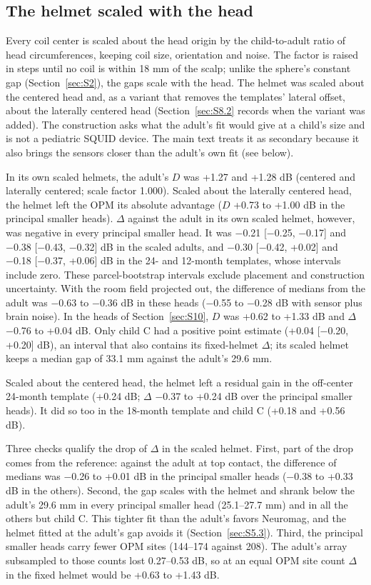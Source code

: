 \documentclass[preprint,12pt,authoryear,a4paper]{elsarticle}
\begin{document}
\subsection{The helmet scaled with the head}\label{sec:S5.2}

Every coil center is scaled about the head origin by the child-to-adult ratio of head circumferences, keeping coil size, orientation and noise. The factor is raised in steps until no coil is within 18 mm of the scalp; unlike the sphere's constant gap (Section~\ref{sec:S2}), the gaps scale with the head. The helmet was scaled about the centered head and, as a variant that removes the templates' lateral offset, about the laterally centered head (Section~\ref{sec:S8.2} records when the variant was added). The construction asks what the adult's fit would give at a child's size and is not a pediatric SQUID device. The main text treats it as secondary because it also brings the sensors closer than the adult's own fit (see below).

In its own scaled helmets, the adult's $D$ was +1.27 and +1.28 dB (centered and laterally centered; scale factor 1.000). Scaled about the laterally centered head, the helmet left the OPM its absolute advantage ($D$ +0.73 to +1.00 dB in the principal smaller heads). $\Delta$ against the adult in its own scaled helmet, however, was negative in every principal smaller head. It was −0.21 [−0.25, −0.17] and −0.38 [−0.43, −0.32] dB in the scaled adults, and −0.30 [−0.42, +0.02] and −0.18 [−0.37, +0.06] dB in the 24- and 12-month templates, whose intervals include zero. These parcel-bootstrap intervals exclude placement and construction uncertainty. With the room field projected out, the difference of medians from the adult was −0.63 to −0.36 dB in these heads (−0.55 to −0.28 dB with sensor plus brain noise). In the heads of Section~\ref{sec:S10}, $D$ was +0.62 to +1.33 dB and $\Delta$ −0.76 to +0.04 dB. Only child C had a positive point estimate (+0.04 [−0.20, +0.20] dB), an interval that also contains its fixed-helmet $\Delta$; its scaled helmet keeps a median gap of 33.1 mm against the adult's 29.6 mm.

Scaled about the centered head, the helmet left a residual gain in the off-center 24-month template (+0.24 dB; $\Delta$ −0.37 to +0.24 dB over the principal smaller heads). It did so too in the 18-month template and child C (+0.18 and +0.56 dB).

Three checks qualify the drop of $\Delta$ in the scaled helmet. First, part of the drop comes from the reference: against the adult at top contact, the difference of medians was −0.26 to +0.01 dB in the principal smaller heads (−0.38 to +0.33 dB in the others). Second, the gap scales with the helmet and shrank below the adult's 29.6 mm in every principal smaller head (25.1–27.7 mm) and in all the others but child C. This tighter fit than the adult's favors Neuromag, and the helmet fitted at the adult's gap avoids it (Section~\ref{sec:S5.3}). Third, the principal smaller heads carry fewer OPM sites (144–174 against 208). The adult's array subsampled to those counts lost 0.27–0.53 dB, so at an equal OPM site count $\Delta$ in the fixed helmet would be +0.63 to +1.43 dB.
\end{document}
